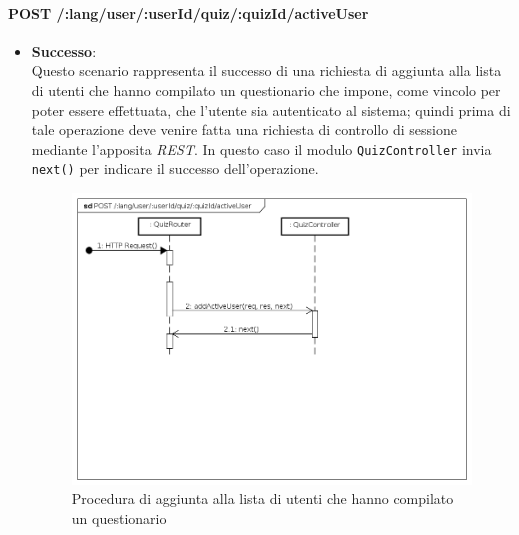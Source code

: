 \paragraph{POST /:lang/user/:userId/quiz/:quizId/activeUser} %
\begin{itemize}
\item \textbf{Successo}:\\
Questo scenario rappresenta il successo di una richiesta di aggiunta alla lista di utenti che hanno compilato un questionario che impone, come vincolo per poter essere effettuata, che l'utente sia autenticato al sistema; quindi prima di tale operazione deve venire fatta una richiesta di controllo di sessione mediante l'apposita \textit{REST}. In questo caso il modulo \texttt{QuizController} invia \texttt{next()} per indicare il successo dell'operazione.
\label{Procedura di aggiunta alla lista di utenti che hanno compilato un questionario}
\begin{figure}[ht]
	\centering
	\includegraphics[scale=0.40]{UML/DiagrammiDiSequenza/Back-end/POST__lang_user_userId_quiz_quizId_activeUser_success.png}
	\caption{Procedura di aggiunta alla lista di utenti che hanno compilato un questionario}
\end{figure}
\FloatBarrier


\end{itemize}
